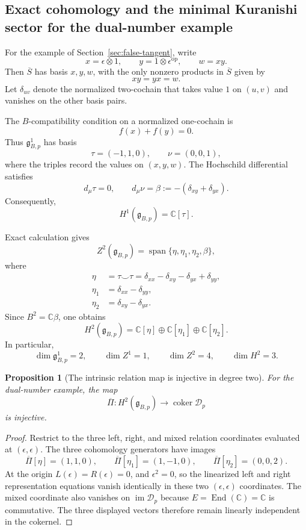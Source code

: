 \documentclass[11pt]{amsart}
\newtheorem{proposition}[theorem]{Proposition}
\newcommand{\End}{\operatorname{End}}
\newcommand{\Span}{\operatorname{span}}
\newcommand{\coker}{\operatorname{coker}}
\newcommand{\cD}{\mathscr D}
\newcommand{\C}{\mathbb C}
\newcommand{\ghoch}{\mathfrak g}
\begin{document}
\subsection{Exact cohomology and the minimal Kuranishi sector for the dual-number example}

For the example of Section~\ref{sec:false-tangent}, write
\[
x=\epsilon\otimes1,
\qquad
y=1\otimes\epsilon^{\mathrm{op}},
\qquad
w=xy.
\]
Then $\overline S$ has basis $x,y,w$, with the only nonzero products in $\overline S$ given by
\[
xy=yx=w.
\]
Let $\delta_{uv}$ denote the normalized two-cochain that takes value $1$ on $(u,v)$ and vanishes on the other basis pairs.

The $B$-compatibility condition on a normalized one-cochain is
\[
f(x)+f(y)=0.
\]
Thus $\ghoch^1_{B,p}$ has basis
\[
\tau=(-1,1,0),
\qquad
\nu=(0,0,1),
\]
where the triples record the values on $(x,y,w)$.  The Hochschild differential satisfies
\[
d_\mu\tau=0,
\qquad
d_\mu\nu=\beta:=-(\delta_{xy}+\delta_{yx}).
\]
Consequently,
\[
H^1(\ghoch_{B,p})=\C[\tau].
\]

Exact calculation gives
\[
Z^2(\ghoch_{B,p})
=
\Span\{\eta,\eta_1,\eta_2,\beta\},
\]
where
\begin{align*}
\eta&=\tau\smile\tau
=\delta_{xx}-\delta_{xy}-\delta_{yx}+\delta_{yy},\\
\eta_1&=\delta_{xx}-\delta_{yy},\\
\eta_2&=\delta_{xy}-\delta_{yx}.
\end{align*}
Since $B^2=\C\beta$, one obtains
\[
H^2(\ghoch_{B,p})
=
\C[\eta]\oplus\C[\eta_1]\oplus\C[\eta_2].
\]
In particular,
\[
\dim\ghoch^1_{B,p}=2,
\qquad
\dim Z^1=1,
\qquad
\dim Z^2=4,
\qquad
\dim H^2=3.
\]

\begin{proposition}[The intrinsic relation map is injective in degree two]\label{prop:dual-h2-injective}
For the dual-number example, the map
\[
\overline\Pi:H^2(\ghoch_{B,p})\longrightarrow\coker\cD_p
\]
is injective.
\end{proposition}

\begin{proof}
Restrict to the three left, right, and mixed relation coordinates evaluated at $(\epsilon,\epsilon)$.  The three cohomology generators have images
\[
\overline\Pi[\eta]=(1,1,0),
\qquad
\overline\Pi[\eta_1]=(1,-1,0),
\qquad
\overline\Pi[\eta_2]=(0,0,2).
\]
At the origin $L(\epsilon)=R(\epsilon)=0$, and $\epsilon^2=0$, so the linearized left and right representation equations vanish identically in these two $(\epsilon,\epsilon)$ coordinates.  The mixed coordinate also vanishes on $\operatorname{im}\cD_p$ because $E=\End(\C)=\C$ is commutative.  The three displayed vectors therefore remain linearly independent in the cokernel.
\end{proof}
\end{document}
